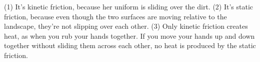 (1) It's kinetic friction, because her uniform is sliding over
 the dirt. (2) It's static friction, because even though the
two surfaces are moving relative to the landscape, they're not slipping
 over each other. (3) Only kinetic friction
creates heat, as when you rub your hands together. If you
 move your hands up and down together without sliding
them across each other, no heat is produced by the static friction.



